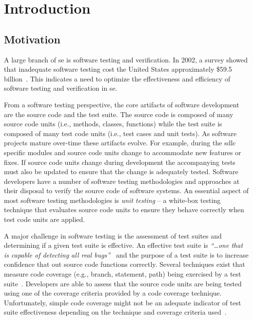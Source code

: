 \chapter{Introduction}
\label{chap:introduction}


\section{Motivation}
\label{sec:introduction_motivation}
A large branch of \gls{se} is software testing and verification. In 2002, a survey showed that inadequate software testing cost the United States approximately \$59.5 billion~\cite{RTI02}. This indicates a need to optimize the effectiveness and efficiency of software testing and verification in \gls{se}.

From a software testing perspective, the core artifacts of software development are the source code and the test suite. The source code is composed of many source code units (i.e., methods, classes, functions) while the test suite is composed of many test code units (i.e., test cases and unit tests). As software projects mature over-time these artifacts evolve. For example, during the \gls{sdlc} specific modules and source code units change to accommodate new features or fixes. If source code units change during development the accompanying tests must also be updated to ensure that the change is adequately tested. Software developers have a number of software testing methodologies and approaches at their disposal to verify the source code of software systems. An essential aspect of most software testing methodologies is \emph{unit testing} -- a white-box testing technique that evaluates source code units to ensure they behave correctly when test code units are applied.

A major challenge in software testing is the assessment of test suites and determining if a given test suite is effective. An effective test suite is \emph{``\ldots one that is capable of detecting all real bugs''}~\cite{Wey93} and the purpose of a test suite is to increase confidence that out source code functions correctly. Several techniques exist that measure code coverage (e.g., branch, statement, path) being exercised by a test suite~\cite{ZHM97}. Developers are able to assess that the source code units are being tested using one of the coverage criteria provided by a code coverage technique. Unfortunately, simple code coverage might not be an adequate indicator of test suite effectiveness depending on the technique and coverage criteria used~\cite{NA09,GJ08}.

